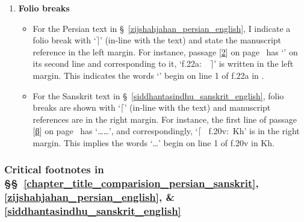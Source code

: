 \begin{enumerate}[topsep=0pt]
    \item \textbf{Folio breaks}
    \begin{itemize}[topsep=0pt]
        \item For the Persian text in \S~\ref{zijshahjahan_persian_english}, I indicate a folio break with `$\rceil$' (in-line with the text) and state the manuscript reference in the left margin. For instance, passage [\hyperlink{Ppass2}{2}] on page~\pageref{folio_break_persian_example} has `' on its second line and corresponding to it, `f.\thinspace 22a:~\SjA~$\rceil$' is written in the left margin. This indicates the words `' begin on line 1 of f.\thinspace 22a in \SjA.
        \item For the Sanskrit text in \S~\ref{siddhantasindhu_sanskrit_english}, folio breaks are shown with `$\lceil$' (in-line with the text) and manuscript references are in the right margin. For instance, the first line of passage [\hyperlink{SpassB}{β}] on page~\pageref{folio_break_sanskrit_example} has `\dots{}\dots', and correspondingly, `$\lceil$~ f.\thinspace 20v:~Kh' is in the right margin. This implies the words `\dots' begin on line 1 of f.20v in Kh. 
    \end{itemize}
\end{enumerate}

\subsubsection{Critical footnotes in \S\S~\ref{chapter_title_comparision_persian_sanskrit}, \ref{zijshahjahan_persian_english}, \& \ref{siddhantasindhu_sanskrit_english}}\label{critical_footnotes_in_sec_2_3_4}

